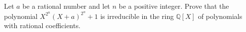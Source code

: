 Let \(a\) be a rational number and let \(n\) be a positive integer. Prove that the polynomial \(X^{2^n}(X+a)^{2^n}+1\) is irreducible in the ring \(\mathbb{Q}[X]\) of polynomials with rational coefficients.

